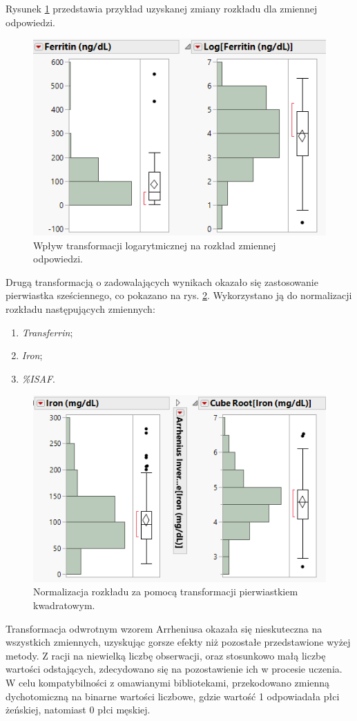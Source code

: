 	Rysunek \ref{fig:log2} przedstawia przykład uzyskanej zmiany rozkładu dla zmiennej odpowiedzi.
	
	\begin{figure}[!ht]
		\centering
		\includegraphics[width=0.6\linewidth]{Rozdzial3/log2}
		\caption{Wpływ transformacji logarytmicznej na rozkład zmiennej odpowiedzi.}
		\label{fig:log2}
	\end{figure}

	Drugą transformacją o zadowalających wynikach okazało się zastosowanie pierwiastka sześciennego, co pokazano na rys. \ref{fig:cube2}. Wykorzystano ją do normalizacji rozkładu następujących zmiennych:
	
	\begin{enumerate}
		\item \textit{Transferrin};
		\item \textit{Iron};
		\item \textit{\%ISAF}.
	\end{enumerate}

	\begin{figure}
		\centering
		\includegraphics[width=0.6\linewidth]{Rozdzial3/cube2}
		\caption{Normalizacja rozkładu za pomocą transformacji pierwiastkiem kwadratowym.}
		\label{fig:cube2}
	\end{figure}

	Transformacja odwrotnym wzorem Arrheniusa okazała się nieskuteczna na wszystkich zmiennych, uzyskując gorsze efekty niż pozostałe przedstawione wyżej metody. Z racji na niewielką liczbę obserwacji, oraz stosunkowo małą liczbę wartości odstających, zdecydowano się na pozostawienie ich w procesie uczenia. W celu kompatybilności z omawianymi bibliotekami, przekodowano zmienną dychotomiczną na binarne wartości liczbowe, gdzie wartość 1 odpowiadała płci żeńskiej, natomiast 0 płci męskiej.

